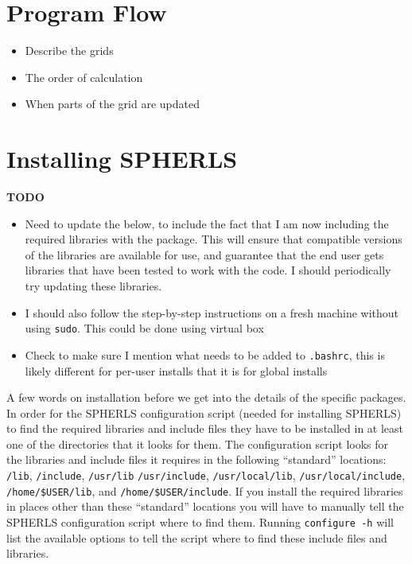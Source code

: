 \documentclass[11pt]{article}
\begin{document}
\section{Program Flow}
\begin{itemize}
\item Describe the grids
\item The order of calculation
\item When parts of the grid are updated
\end{itemize}
\section{Installing SPHERLS}
\textbf{TODO}
\begin{itemize}
\item Need to update the below, to include the fact that I am now including the required libraries with the package. This will ensure that compatible versions of the libraries are available for use, and guarantee that the end user gets libraries that have been tested to work with the code. I should periodically try updating these libraries.
\item I should also follow the step-by-step instructions on a fresh machine without using {\tt sudo}. This could be done using virtual box
\item Check to make sure I mention what needs to be added to {\tt .bashrc}, this is likely different for per-user installs that it is for global installs
\end{itemize}

A few words on installation before we get into the details of the specific packages. In order for the SPHERLS configuration script (needed for installing SPHERLS) to find the required libraries and include files they have to be installed in at least one of the directories that it looks for them. The configuration script looks for the libraries and include files it requires in the following ``standard'' locations: {\tt /lib}, {\tt /include}, {\tt /usr/lib} {\tt /usr/include}, {\tt /usr/local/lib}, {\tt /usr/local/include}, {\tt /home/\$USER/lib}, and {\tt /home/\$USER/include}. If you install the required libraries in places other than these ``standard'' locations you will have to manually tell the SPHERLS configuration script where to find them. Running {\tt configure -h} will list the available options to tell the script where to find these include files and libraries.
\end{document}
